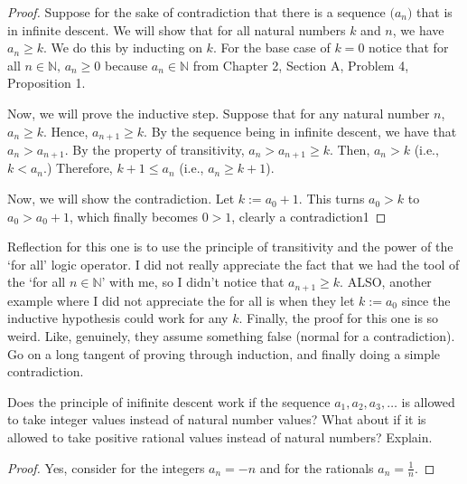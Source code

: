 \begin{proof}
    Suppose for the sake of contradiction that there is a sequence $\big(a_n\big)$ that is in infinite descent.
    We will show that for all natural numbers $k$ and $n$, we have $a_n \geq k.$ We do this by inducting on $k.$
    For the base case of $k = 0$ notice that for all $n \in \mathbb{N}, \, a_n \geq 0$ because $a_n \in \mathbb{N}$ from Chapter 2, Section A, Problem 4, Proposition 1.

    Now, we will prove the inductive step. 
    Suppose that for any natural number $n$, $a_n \geq k$. Hence, $a_{n+1} \geq k$. 
    By the sequence being in infinite descent, we have that $a_n > a_{n+1}.$
    By the property of transitivity, $a_n > a_{n+1} \geq k$. Then, $a_n > k$ (i.e., $k < a_n.$)
    Therefore, $k + 1 \leq a_n$ (i.e., $a_n \geq k +1$).

    Now, we will show the contradiction. Let $k := a_0 + 1.$ 
    This turns $a_0 > k$ to $a_0 > a_0 + 1$, which finally becomes $0 > 1$, clearly a contradiction1
\end{proof}

Reflection for this one is to use the principle of transitivity and the power of the `for all' logic operator. 
I did not really appreciate the fact that we had the tool of the `for all $n \in \mathbb{N}$' with me, so I didn't notice that $a_{n + 1} \geq k.$
ALSO, another example where I did not appreciate the for all is when they let $k := a_0$ since the inductive hypothesis could work for any $k$.
Finally, the proof for this one is so weird. 
Like, genuinely, they assume something false (normal for a contradiction). Go on a long tangent of proving through induction, and finally doing a simple contradiction.
\begin{proposition}
    Does the principle of inifinite descent work if the sequence $a_1, a_2, a_3, \dots$ is allowed to take integer values instead of natural number values?
    What about if it is allowed to take positive rational values instead of natural numbers? Explain. 
\end{proposition}
\begin{proof}
    Yes, consider for the integers $a_n = -n$ and for the rationals $a_n = \frac{1}{n}$.
\end{proof}

